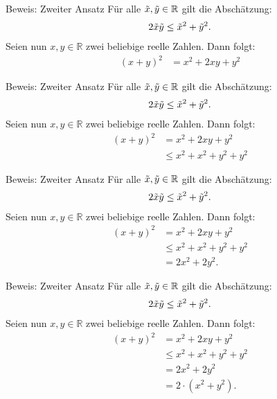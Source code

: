 \documentclass[10pt]{beamer}
\def\bR{\mathbb{R}}
\begin{document}
\begin{frame}{Beweis: Zweiter Ansatz}
    Für alle \( \Tilde{x}, \Tilde{y} \in \bR \) gilt die Abschätzung:
    \begin{align*}
        2\Tilde{x}\Tilde{y}
        \leq \Tilde{x}^{2} + \Tilde{y}^{2}.
    \end{align*}
    Seien nun \( x, y \in \bR \) zwei beliebige reelle Zahlen. Dann folgt:
    \begin{align*}
        \left( x + y \right)^{2}
        & = x^{2} + 2xy + y^{2}
    \end{align*}
\end{frame}



\begin{frame}{Beweis: Zweiter Ansatz}
    Für alle \( \Tilde{x}, \Tilde{y} \in \bR \) gilt die Abschätzung:
    \begin{align*}
        2\Tilde{x}\Tilde{y}
        \leq \Tilde{x}^{2} + \Tilde{y}^{2}.
    \end{align*}
    Seien nun \( x, y \in \bR \) zwei beliebige reelle Zahlen. Dann folgt:
    \begin{align*}
        \left( x + y \right)^{2}
        & = x^{2} + 2xy + y^{2} \\
        & \leq x^{2} + x^{2} + y^{2} + y^{2}
    \end{align*}
\end{frame}



\begin{frame}{Beweis: Zweiter Ansatz}
    Für alle \( \Tilde{x}, \Tilde{y} \in \bR \) gilt die Abschätzung:
    \begin{align*}
        2\Tilde{x}\Tilde{y}
        \leq \Tilde{x}^{2} + \Tilde{y}^{2}.
    \end{align*}
    Seien nun \( x, y \in \bR \) zwei beliebige reelle Zahlen. Dann folgt:
    \begin{align*}
        \left( x + y \right)^{2}
        & = x^{2} + 2xy + y^{2} \\
        & \leq x^{2} + x^{2} + y^{2} + y^{2} \\
        & = 2x^{2} + 2y^{2}.
    \end{align*}
\end{frame}



\begin{frame}{Beweis: Zweiter Ansatz}
    Für alle \( \Tilde{x}, \Tilde{y} \in \bR \) gilt die Abschätzung:
    \begin{align*}
        2\Tilde{x}\Tilde{y}
        \leq \Tilde{x}^{2} + \Tilde{y}^{2}.
    \end{align*}
    Seien nun \( x, y \in \bR \) zwei beliebige reelle Zahlen. Dann folgt:
    \begin{align*}
        \left( x + y \right)^{2}
        & = x^{2} + 2xy + y^{2} \\
        & \leq x^{2} + x^{2} + y^{2} + y^{2} \\
        & = 2x^{2} + 2y^{2} \\
        & = 2 \cdot \left( x^{2} + y^{2} \right).
    \end{align*}
\end{frame}
\end{document}
